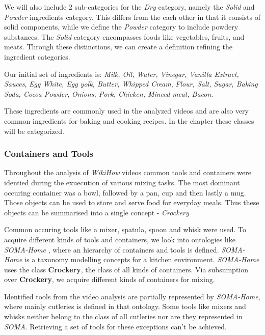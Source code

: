 We will also include 2 sub-categories for the \textit{Dry} category, namely the \textit{Solid} and \textit{Powder} ingredients category. 
This differs from the each other in that it consists of solid components, while we define the \textit{Powder} category to include powdery substances. The \textit{Solid} category encompasses foods like vegetables, fruits, and meats. 
Through these distinctions, we can create a definition refining the ingredient categories.

Our initial set of ingredients is: \textit{Milk, Oil, Water, Vinegar, Vanilla Extract, Sauces}, \textit{Egg White, Egg yolk, Butter, Whipped Cream}, \textit{Flour, Salt, Sugar, Baking Soda, Cocoa Powder},
\textit{Onions, Pork, Chicken, Minced meat, Bacon}.

These ingredients are commonly used in the analyzed videos and are also very common ingredients for baking and cooking recipes.
In the chapter  these classes will be categorized.

\subsubsection{Containers and Tools}
\label{sec:ContainersAndToolsAcquisition}
Throughout the analysis of \textit{WikiHow} videos common tools and containers were identied during the exuecution of various mixing tasks.
The most dominant occuring container was a bowl, followed by a pan, cup and then lastly a mug.
Those objects can be used to store and serve food for everyday meals. Thus these objects can be summarised 
into a single concept - \textit{Crockery} \cite{crockery}

Common occuring tools like a mixer, spatula, spoon and whisk were used. 
To acquire different kinds of tools and containers, we look into ontologies like \textit{SOMA-Home} \cite{soma},
where an hierarchy of containers and tools is defined. \textit{SOMA-Home} is a taxonomy modelling concepts for a kitchen environment. 
\textit{SOMA-Home} uses the class \textbf{Crockery}, the class of all kinds of containers.
Via subsumption over \textbf{Crockery}, we acquire different kinds of containers for mixing.

Identified tools from the video analysis are partially represented by \textit{SOMA-Home}, where mainly cutleries is defined in that ontology.
Some tools like mixers and whisks neither belong to the class of all cutleries nor are they represented in \textit{SOMA}. Retrieving a set of tools
for these exceptions can't be achieved.


